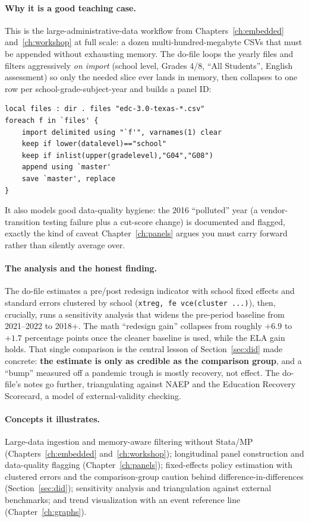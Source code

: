 \documentclass[
    a4paper,
    fontsize=10pt,
    twoside=true,
    numbers=noenddot,
]{kaobook}
\begin{document}
\paragraph{Why it is a good teaching case.} This is the large-administrative-data workflow from Chapters~\ref{ch:embedded} and~\ref{ch:workshop} at full scale: a dozen multi-hundred-megabyte CSVs that must be appended without exhausting memory. The do-file loops the yearly files and filters aggressively \emph{on import} (school level, Grades 4/8, \enquote{All Students}, English assessment) so only the needed slice ever lands in memory, then collapses to one row per school-grade-subject-year and builds a panel ID:
{\footnotesize
\begin{verbatim}
local files : dir . files "edc-3.0-texas-*.csv"
foreach f in `files' {
    import delimited using "`f'", varnames(1) clear
    keep if lower(datalevel)=="school"
    keep if inlist(upper(gradelevel),"G04","G08")
    append using `master'
    save `master', replace
}
\end{verbatim}
}
It also models good data-quality hygiene: the 2016 \enquote{polluted} year (a vendor-transition testing failure plus a cut-score change) is documented and flagged, exactly the kind of caveat Chapter~\ref{ch:panels} argues you must carry forward rather than silently average over.

\paragraph{The analysis and the honest finding.} The do-file estimates a pre/post redesign indicator with school fixed effects and standard errors clustered by school (\texttt{xtreg, fe vce(cluster ...)}), then, crucially, runs a sensitivity analysis that widens the pre-period baseline from 2021--2022 to 2018+. The math \enquote{redesign gain} collapses from roughly $+6.9$ to $+1.7$ percentage points once the cleaner baseline is used, while the ELA gain holds. That single comparison is the central lesson of Section~\ref{sec:did} made concrete: \textbf{the estimate is only as credible as the comparison group}, and a \enquote{bump} measured off a pandemic trough is mostly recovery, not effect. The do-file's notes go further, triangulating against NAEP and the Education Recovery Scorecard, a model of external-validity checking.

\paragraph{Concepts it illustrates.} Large-data ingestion and memory-aware filtering without Stata/MP (Chapters~\ref{ch:embedded} and~\ref{ch:workshop}); longitudinal panel construction and data-quality flagging (Chapter~\ref{ch:panels}); fixed-effects policy estimation with clustered errors and the comparison-group caution behind difference-in-differences (Section~\ref{sec:did}); sensitivity analysis and triangulation against external benchmarks; and trend visualization with an event reference line (Chapter~\ref{ch:graphs}).

\backmatter
\printbibliography[heading=bibintoc, title=Bibliography]
\end{document}
